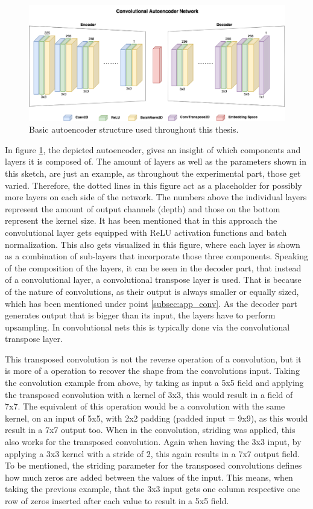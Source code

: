 \begin{figure}[htb!]
	\caption{Basic autoencoder structure used throughout this thesis.}
	\label{fig:app_autoencoder}
	\centering
	\includegraphics[width=\textwidth]{images/approach/autoencoder.png}
\end{figure}

In figure \ref{fig:app_autoencoder}, the depicted autoencoder, gives an insight of which components and layers it is composed of. The amount of layers as well as the parameters shown in this sketch, are just an example, as throughout the experimental part, those get varied. Therefore, the dotted lines in this figure act as a placeholder for possibly more layers on each side of the network. The numbers above the individual layers represent the amount of output channels (depth) and those on the bottom represent the kernel size. It has been mentioned that in this approach the convolutional layer gets equipped with ReLU activation functions and batch normalization. This also gets visualized in this figure, where each layer is shown as a combination of sub-layers that incorporate those three components. Speaking of the composition of the layers, it can be seen in the decoder part, that instead of a convolutional layer, a convolutional transpose layer is used. That is because of the nature of convolutions, as their output is always smaller or equally sized, which has been mentioned under point \ref{subsec:app_conv}. As the decoder part generates output that is bigger than its input, the layers have to perform upsampling. In convolutional nets this is typically done via the convolutional transpose layer.

This transposed convolution is not the reverse operation of a convolution, but it is more of a operation to recover the shape from the convolutions input. \cite{dumoulin2018guideconv} Taking the convolution example from above, by taking as input a 5x5 field and applying the transposed convolution with a kernel of 3x3, this would result in a field of 7x7. The equivalent of this operation would be a convolution with the same kernel, on an input of 5x5, with 2x2 padding (padded input = 9x9), as this would result in a 7x7 output too.
When in the convolution, striding was applied, this also works for the transposed convolution. Again when having the 3x3 input, by applying a 3x3 kernel with a stride of 2, this again results in a 7x7 output field. To be mentioned, the striding parameter for the transposed convolutions defines how much zeros are added between the values of the input. This means, when taking the previous example, that the 3x3 input gets one column respective one row of zeros inserted after each value to result in a 5x5 field.

